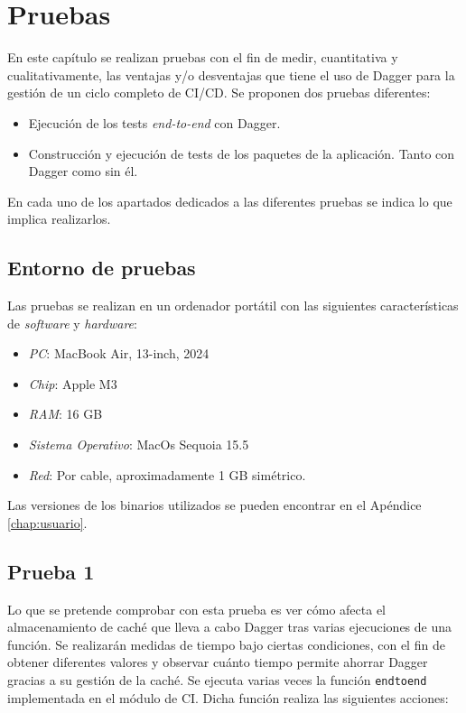 \chapter{Pruebas}
\label{chap:pruebas}

En este capítulo se realizan pruebas con el fin de medir, cuantitativa y cualitativamente, las ventajas y/o desventajas que tiene el uso de Dagger para la gestión de un ciclo completo de CI/CD. Se proponen dos pruebas diferentes:

\begin{itemize}
  \item Ejecución de los tests \textit{end-to-end} con Dagger.
  \item Construcción y ejecución de tests de los paquetes de la aplicación. Tanto con Dagger como sin él.
\end{itemize}

En cada uno de los apartados dedicados a las diferentes pruebas se indica lo que implica realizarlos.

\section{Entorno de pruebas}

Las pruebas se realizan en un ordenador portátil con las siguientes características de \textit{software} y \textit{hardware}:

\begin{itemize}
  \item \textit{PC}: MacBook Air, 13-inch, 2024
  \item \textit{Chip}: Apple M3
  \item \textit{RAM}: 16 GB
  \item \textit{Sistema Operativo}: MacOs Sequoia 15.5
  \item \textit{Red}: Por cable, aproximadamente 1 GB simétrico.
\end{itemize}

Las versiones de los binarios utilizados se pueden encontrar en el Apéndice \ref{chap:usuario}.

\section{Prueba 1}

Lo que se pretende comprobar con esta prueba es ver cómo afecta el almacenamiento de caché que lleva a cabo Dagger tras varias ejecuciones de una función. Se realizarán medidas de tiempo bajo ciertas condiciones, con el fin de obtener diferentes valores y observar cuánto tiempo permite ahorrar Dagger gracias a su gestión de la caché. Se ejecuta varias veces la función \texttt{endtoend} implementada en el módulo de CI. Dicha función realiza las siguientes acciones:

